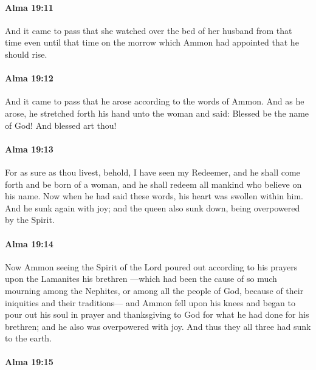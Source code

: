 		\paragraph{Alma 19:11} %
			\label{ALMA-19-11}

			And it came to pass that she watched over the bed of her husband
			from that time even until that time on the morrow
			which Ammon had appointed that he should rise.

		\paragraph{Alma 19:12} %
			\label{ALMA-19-12}

			And it came to pass that he arose according to the words of Ammon.
			And as he arose, he stretched forth his hand unto the woman and said:
			Blessed be the name of God!
			And blessed art thou!

		\paragraph{Alma 19:13} %
			\label{ALMA-19-13}

			For as sure as thou livest,
			behold, I have seen my Redeemer,
			and he shall come forth and be born of a woman,
			and he shall redeem all mankind who believe on his name.
			Now when he had said these words, his heart was swollen within him.
			And he sunk again with joy;
			and the queen also sunk down,
			being overpowered by the Spirit.

		\paragraph{Alma 19:14} %
			\label{ALMA-19-14}

			Now Ammon seeing the Spirit of the Lord poured out
			according to his prayers
			upon the Lamanites his brethren
			---which had been the cause of so much mourning among the Nephites,
			or among all the people of God,
			because of their iniquities and their traditions---
			and Ammon fell upon his knees
			and began to pour out his soul
			in prayer and thanksgiving to God for what he had done for his brethren;
			and he also was overpowered with joy.
			And thus they all three had sunk to the earth.

		\paragraph{Alma 19:15} %
			\label{ALMA-19-15}

